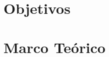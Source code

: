 \documentclass[osajnl,twocolumn,showpacs,superscriptaddress,10pt]{revtex4-1}
\begin{document}





\begin{abstract}


\end{abstract}



\maketitle{}


\section{Objetivos}



 
 
\section{Marco Teórico}

\end{document}
